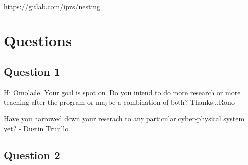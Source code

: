 \documentclass{article}
\begin{document}
\url{https://gitlab.com/ipvs/nesting}
\section{Questions}
\subsection{Question 1}

Hi Omolade. Your goal is spot on! Do you intend to do more research or more teaching after the program or maybe a combination of both? Thanks ..Rono

Have you narrowed down your reserach to any particular cyber-physical system yet? - Dustin Trujillo


\subsection{Question 2}
\end{document}
